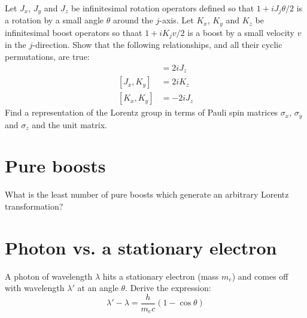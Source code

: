 \documentclass[a4paper, 11pt, oneside]{impression}
\begin{document}
\begin{exercise}{}
    Let $J_{x}$, $J_{y}$ and $J_{z}$ be infinitesimal rotation operators defined so that $1 + iJ_{j}\theta/2$ is a rotation by a small angle $\theta$ around the $j$-axis. Let $K_{x}$, $K_{y}$ and $K_{z}$ be infinitesimal boost operators so thaat $1 + iK_{j}v/2$ is a boost by a small velocity $v$ in the $j$-direction. Show that the following relationships, and all their cyclic permutations, are true:
    \begin{align*}
        [J_{x}, J_{y}] &= 2iJ_{z} \\
        [J_{x}, K_{y}] &= 2iK_{z} \\
        [K_{x}, K_{y}] &= -2iJ_{z}
    \end{align*}
    Find a representation of the Lorentz group in terms of Pauli spin matrices $\sigma_{x}$, $\sigma_{y}$ and $\sigma_{z}$ and the unit matrix.
\end{exercise}



\newpage

\chapter{Pure boosts}\label{quest: five}

\begin{exercise}{}
    What is the least number of pure boosts which generate an arbitrary Lorentz transformation?
\end{exercise}



\newpage

\chapter{Photon vs. a stationary electron}\label{quest: six}

\begin{exercise}{}
    A photon of wavelength $\lambda$ hits a stationary electron (mass $m_{e}$) and comes off with wavelength $\lambda'$ at an angle $\theta$. Derive the expression:
    \begin{equation*}
        \lambda' - \lambda = \dfrac{h}{m_{e}c}(1 - \cos\theta)
    \end{equation*}
\end{exercise}



\newpage
\end{document}
